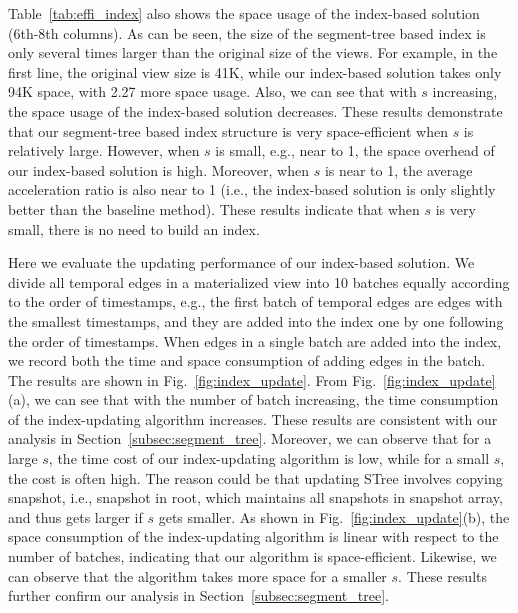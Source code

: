 \documentclass[10pt,journal,compsoc]{IEEEtran}
\begin{document}
Table~\ref{tab:effi_index} also shows the space usage of the index-based solution (6th-8th columns). As can be seen, the size of the segment-tree based index is only several times larger than the original size of the views. For example, in the first line, the original view size is 41K, while our index-based solution takes only 94K space, with 2.27 more space usage. Also, we can see that with $s$ increasing, the space usage of the index-based solution decreases. These results demonstrate that our segment-tree based index structure is very space-efficient when $s$ is relatively large. However, when $s$ is small, e.g., near to 1, the space overhead of our index-based solution is high. Moreover, when $s$ is near to 1, the average acceleration ratio is also near to 1 (i.e., the index-based solution is only slightly better than the baseline method). These results indicate that when $s$ is very small, there is no need to build an index.


 Here we evaluate the updating performance of our index-based solution. We divide all temporal edges in a materialized view into 10 batches equally according to the order of timestamps, e.g., the first batch of temporal edges are edges with the smallest timestamps, and they are added into the index one by one following the order of timestamps. When edges in a single batch are added into the index, we record both the time and space consumption of adding edges in the batch. The results are shown in Fig.~\ref{fig:index_update}. From Fig.~\ref{fig:index_update}(a), we can see that with the number of batch increasing, the time consumption of the index-updating algorithm increases. These results are consistent with our analysis in Section~\ref{subsec:segment_tree}. Moreover, we can observe that for a large $s$, the time cost of our index-updating algorithm is low, while for a small $s$, the cost is often high. The reason could be that updating STree involves copying snapshot, i.e., snapshot in root, which maintains all snapshots in snapshot array, and thus gets larger if $ s $ gets smaller. As shown in Fig.~\ref{fig:index_update}(b), the space consumption of the index-updating algorithm is linear with respect to the number of batches, indicating that our algorithm is space-efficient. Likewise, we can observe that the algorithm takes more space for a smaller $s$. These results further confirm our analysis in Section~\ref{subsec:segment_tree}.
\end{document}

